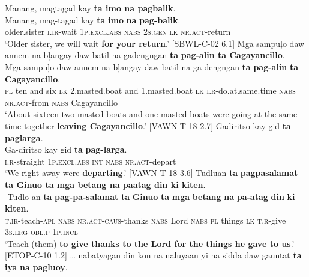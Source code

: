 \ea
\label{bkm:Ref114821261}
Manang,  magtagad  kay  \textbf{ta imo na pagbalik}. \smallskip\\
\gll Manang,  mag-tagad  kay  \textbf{ta}  \textbf{imo}  \textbf{na}  \textbf{pag-balik}. \\
older.sister  \textsc{i.ir}-wait  1\textsc{p.excl.abs}  \textsc{nabs}  2\textsc{s.gen}  \textsc{lk}  \textsc{nr.act}-return \\
\glt ‘Older sister, we will wait \textbf{for your return}.’ [SBWL-C-02 6.1]
\z
\ea
Mga  sampuļo  daw  annem  na  bļangay  daw  batil na  gadengngan  \textbf{ta}  \textbf{pag-alin  ta  Cagayancillo}. \smallskip\\
\gll Mga  sampuļo  daw  annem  na  bļangay  daw  batil na  ga-dengngan  \textbf{ta}  \textbf{pag-alin}   \textbf{ta}  \textbf{Cagayancillo}. \\
\textsc{pl}  ten  and  six  \textsc{lk}  2.masted.boat  and  1.masted.boat
\textsc{lk}  \textsc{i.r}-do.at.same.time  \textsc{nabs}  \textsc{nr.act}-from  \textsc{nabs}  Cagayancillo \\
\glt `About sixteen two-masted boats and one-masted boats were going at the same time together \textbf{leaving Cagayancillo}.’ [VAWN-T-18 2.7]
\z
\ea
Gadiritso  kay  gid  \textbf{ta  paglarga}. \smallskip\\
\gll Ga-diritso  kay  gid  \textbf{ta}  \textbf{pag-larga}. \\
\textsc{i.r}-straight  1\textsc{p.excl.abs}  \textsc{int}  \textsc{nabs}  \textsc{nr.act}-depart \\
\glt ‘We right away were \textbf{departing}.’ [VAWN-T-18 3.6]
\z
\ea
Tudluan  \textbf{ta}  \textbf{pagpasalamat  ta  Ginuo ta  mga betang  na  paatag  din  ki  kiten}. \smallskip\\
\gll \emptyset{}-Tudlo-an  \textbf{ta}  \textbf{pag-pa-salamat}  \textbf{ta}  \textbf{Ginuo}  \textbf{ta}  \textbf{mga} \textbf{betang}  \textbf{na}  \textbf{pa-atag}  \textbf{din}  \textbf{ki}  \textbf{kiten}. \\
\textsc{t.ir}-teach-\textsc{apl}  \textsc{nabs}  \textsc{nr.act}-\textsc{caus}-thanks  \textsc{nabs}  Lord  \textsc{nabs}  \textsc{pl}
things  \textsc{lk}  \textsc{t.r}-give  3\textsc{s.erg}  \textsc{obl.p}  1\textsc{p.incl} \\
\glt `Teach (them) \textbf{to give thanks to the Lord for the things he gave to us}.’ [ETOP-C-10 1.2]
\z
\ea
… nabatyagan  din  kon  na  naluyaan  yi  na  sidda daw  gauntat  \textbf{ta}  \textbf{iya}  \textbf{na}  \textbf{pagluoy}. \smallskip\\

